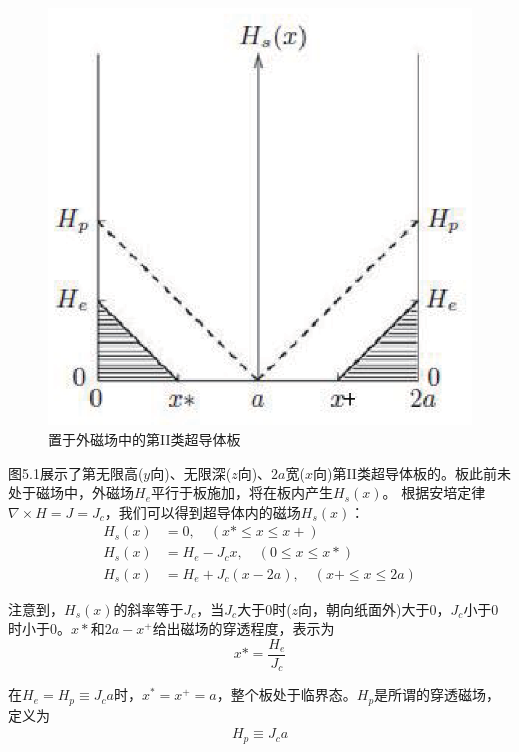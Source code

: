 \begin{figure}[htbp]
  \centering
 \includegraphics[scale=0.8]{chpt5/figs/fig5.1.eps}
  \caption{置于外磁场中的第II类超导体板}\label{fig:slabinfield}
\end{figure}
图5.1展示了第无限高($y$向)、无限深($z$向)、$2a$宽($x$向)第II类超导体板的。板此前未处于磁场中，外磁场$H_e$平行于板施加，将在板内产生$H_s(x)$。
根据安培定律$\nabla \times H = J=J_c$，我们可以得到超导体内的磁场$H_s(x)$：
\begin{subequations}
\begin{align}
H_s(x)&=0,  \quad(x*\le x \le x+)  \\
H_s(x)&= H_e - J_c x,  \quad(0\le x \le x* ) \\
H_s(x)&=H_e + J_c (x-2a),  \quad(x+ \le x \le 2a)
\end{align}
\end{subequations}

注意到，$H_s(x)$的斜率等于$J_c$，当$J_c$大于0时($z$向，朝向纸面外)大于0，$J_c$小于0时小于0。$x*$和$2a-x^+$给出磁场的穿透程度，表示为
\begin{equation}
  x*=\frac{H_e}{J_c}
\end{equation}

在$H_e=H_p\equiv J_c a$时，$x^*=x^+=a$，整个板处于临界态。$H_p$是所谓的穿透磁场，定义为
\begin{align*}
  H_p\equiv J_c a \tag{5.3b}
\end{align*}

